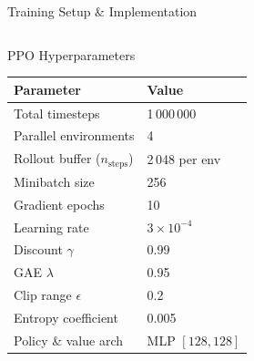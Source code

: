 \documentclass[aspectratio=169]{beamer}
\begin{document}
\begin{frame}{Training Setup \& Implementation}
  \begin{columns}[T]
      \begin{block}{PPO Hyperparameters}
        \renewcommand{\arraystretch}{1.2}
        \begin{tabular}{@{}ll@{}}
          \toprule
          \textbf{Parameter} & \textbf{Value} \\
          \midrule
          Total timesteps & 1\,000\,000 \\
          Parallel environments & 4 \\
          Rollout buffer ($n_\text{steps}$) & 2\,048 per env \\
          Minibatch size & 256 \\
          Gradient epochs & 10 \\
          Learning rate & $3 \times 10^{-4}$ \\
          Discount $\gamma$ & 0.99 \\
          GAE $\lambda$ & 0.95 \\
          Clip range $\epsilon$ & 0.2 \\
          Entropy coefficient & 0.005 \\
          Policy \& value arch & MLP $[128,128]$ \\
          \bottomrule
        \end{tabular}
      \end{block}


\end{columns}
\end{frame}
\end{document}
